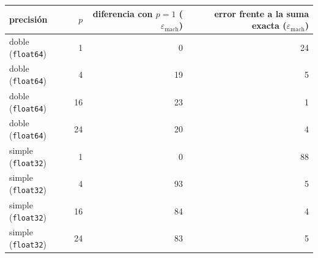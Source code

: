 \begin{tabular}{l r r r}
\toprule
precisión & $p$ & diferencia con $p=1$ ($\varepsilon_\mathrm{mach}$) & error frente a la suma exacta ($\varepsilon_\mathrm{mach}$) \\
\midrule
doble (\texttt{float64}) & 1 & 0 & 24 \\
doble (\texttt{float64}) & 4 & 19 & 5 \\
doble (\texttt{float64}) & 16 & 23 & 1 \\
doble (\texttt{float64}) & 24 & 20 & 4 \\
simple (\texttt{float32}) & 1 & 0 & 88 \\
simple (\texttt{float32}) & 4 & 93 & 5 \\
simple (\texttt{float32}) & 16 & 84 & 4 \\
simple (\texttt{float32}) & 24 & 83 & 5 \\
\bottomrule
\end{tabular}
